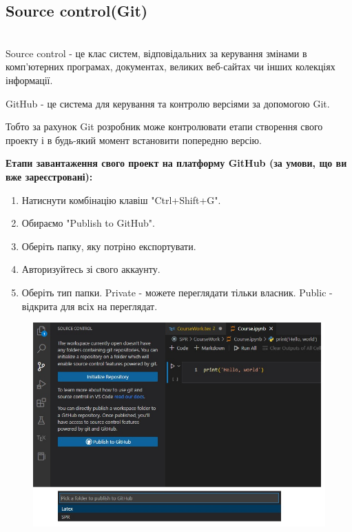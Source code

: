 \documentclass[a4paper,12pt]{article}
\begin{document}
\newpage
    \subsection {Source control(Git)}
    \hrulefill \\

    Source control - це клас систем, відповідальних за керування змінами в комп’ютерних програмах, документах, великих веб-сайтах чи інших колекціях інформації. 

    GitHub - це система для керування та контролю версіями за допомогою Git.

    Тобто за рахунок Git розробник може контролювати етапи створення свого проекту і в будь-який момент встановити попередню версію.
    \begin{center}
        \textbf{Етапи завантаження свого проект на платформу GitHub (за умови, що ви вже зареєстровані):}
    \end{center}
    \begin{enumerate}
        \item Натиснути комбінацію клавіш "Ctrl+Shift+G".
        \item Обираємо "Publish to GitHub".
        \item Оберіть папку, яку потріно експортувати.
        \item Авторизуйтесь зі свого аккаунту.
        \item Оберіть тип папки. Private - можете переглядати тільки власник. Public - відкрита для всіх на переглядат.
    \end{enumerate}
    \begin{figure}[h!]
        \begin{center}
            \includegraphics[scale=0.8]{Prt sc/Figure_7.jpg}
        \end{center}
    \end{figure}
\end{document}

